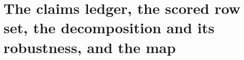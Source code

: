 \section{The claims ledger, the scored row set, the decomposition and its robustness, and the map}
\label{sec:si-tables}

%
%
%
